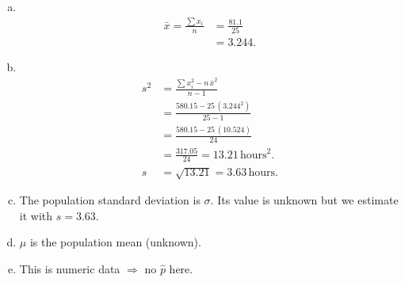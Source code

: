 \documentclass[12pt]{article}
\begin{document}
{\begin{minipage}[t]{0.46\textwidth}
\begin{minipage}[t]{0.5\textwidth}
\vspace{0.2cm}
\begin{enumerate}[a)]
\item \qquad\\[-1.55cm]
\begin{align*}
\bar x = \frac{\sum x_i}{n} &= \frac{81.1}{25}\\[0.2cm]
& = 3.244.
\end{align*}
\item \qquad\\[-1.55cm]
\begin{align*}
s^2 &= \frac{\sum x_i^2 - n\,{\bar x}^2}{n-1} \\[0.2cm]
&= \frac{580.15 - 25 \, (3.244^2)}{25-1} \\[0.2cm]
&= \frac{580.15 - 25 \, (10.524)}{24} \\[0.2cm]
&= \frac{317.05}{24} = 13.21 \, \text{hours$^2$}.\\[0.7cm]
s &= \sqrt{13.21} = 3.63 \, \text{hours}.
\end{align*}
\item The population standard deviation is $\sigma$. Its value is unknown but we estimate it with $s = 3.63$.
\item $\mu$ is the population mean (unknown).
\item This is numeric data $\Rightarrow$ no $\hat p$ here.
\end{enumerate}
\end{minipage}
\end{minipage}}\hspace{0.015\textwidth}
\end{document}
